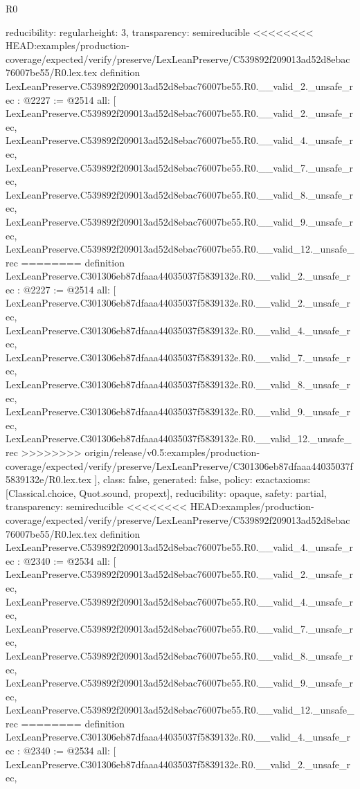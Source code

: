 \begin{lexlean}{R0}
\begin{coremodule}
{{{{{{{{{{{{{{{{{{{{{{{{{{{{{{{{{{{{{{{{{{{{{{{{{{  reducibility: regular{height: 3},
  transparency: semireducible
}
<<<<<<<< HEAD:examples/production-coverage/expected/verify/preserve/LexLeanPreserve/C539892f209013ad52d8ebac76007be55/R0.lex.tex
definition LexLeanPreserve.C539892f209013ad52d8ebac76007be55.R0.__valid_2._unsafe_rec : @2227 := @2514 {
  all: [
    LexLeanPreserve.C539892f209013ad52d8ebac76007be55.R0.__valid_2._unsafe_rec,
    LexLeanPreserve.C539892f209013ad52d8ebac76007be55.R0.__valid_4._unsafe_rec,
    LexLeanPreserve.C539892f209013ad52d8ebac76007be55.R0.__valid_7._unsafe_rec,
    LexLeanPreserve.C539892f209013ad52d8ebac76007be55.R0.__valid_8._unsafe_rec,
    LexLeanPreserve.C539892f209013ad52d8ebac76007be55.R0.__valid_9._unsafe_rec,
    LexLeanPreserve.C539892f209013ad52d8ebac76007be55.R0.__valid_12._unsafe_rec
========
definition LexLeanPreserve.C301306eb87dfaaa44035037f5839132e.R0.__valid_2._unsafe_rec : @2227 := @2514 {
  all: [
    LexLeanPreserve.C301306eb87dfaaa44035037f5839132e.R0.__valid_2._unsafe_rec,
    LexLeanPreserve.C301306eb87dfaaa44035037f5839132e.R0.__valid_4._unsafe_rec,
    LexLeanPreserve.C301306eb87dfaaa44035037f5839132e.R0.__valid_7._unsafe_rec,
    LexLeanPreserve.C301306eb87dfaaa44035037f5839132e.R0.__valid_8._unsafe_rec,
    LexLeanPreserve.C301306eb87dfaaa44035037f5839132e.R0.__valid_9._unsafe_rec,
    LexLeanPreserve.C301306eb87dfaaa44035037f5839132e.R0.__valid_12._unsafe_rec
>>>>>>>> origin/release/v0.5:examples/production-coverage/expected/verify/preserve/LexLeanPreserve/C301306eb87dfaaa44035037f5839132e/R0.lex.tex
  ],
  class: false,
  generated: false,
  policy: exact{axioms: [Classical.choice, Quot.sound, propext]},
  reducibility: opaque{},
  safety: partial,
  transparency: semireducible
}
<<<<<<<< HEAD:examples/production-coverage/expected/verify/preserve/LexLeanPreserve/C539892f209013ad52d8ebac76007be55/R0.lex.tex
definition LexLeanPreserve.C539892f209013ad52d8ebac76007be55.R0.__valid_4._unsafe_rec : @2340 := @2534 {
  all: [
    LexLeanPreserve.C539892f209013ad52d8ebac76007be55.R0.__valid_2._unsafe_rec,
    LexLeanPreserve.C539892f209013ad52d8ebac76007be55.R0.__valid_4._unsafe_rec,
    LexLeanPreserve.C539892f209013ad52d8ebac76007be55.R0.__valid_7._unsafe_rec,
    LexLeanPreserve.C539892f209013ad52d8ebac76007be55.R0.__valid_8._unsafe_rec,
    LexLeanPreserve.C539892f209013ad52d8ebac76007be55.R0.__valid_9._unsafe_rec,
    LexLeanPreserve.C539892f209013ad52d8ebac76007be55.R0.__valid_12._unsafe_rec
========
definition LexLeanPreserve.C301306eb87dfaaa44035037f5839132e.R0.__valid_4._unsafe_rec : @2340 := @2534 {
  all: [
    LexLeanPreserve.C301306eb87dfaaa44035037f5839132e.R0.__valid_2._unsafe_rec,
}}}}}}}}}}}}}}}}}}}}}}}}}}}}}}}}}}}}}}}}}}}}}}}}}}}}
\end{coremodule}
\end{lexlean}
